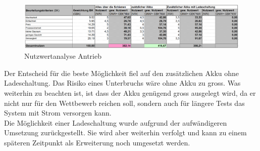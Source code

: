 \documentclass[../../../main.tex]{subfiles}
\begin{document}
    \begin{figure}[H]
        \centering
        \includegraphics[width=1.0\textwidth]{Strom_Nutzwertanalyse.png}
        \caption {Nutzwertanalyse Antrieb}
        \label{fig:strom_nutzwertanalyse}
    \end{figure}

    Der Entscheid für die beste Möglichkeit fiel auf den zusätzlichen Akku ohne Ladeschaltung. Das Risiko eines Unterbruchs wäre ohne Akku zu gross. Was weiterhin zu beachten ist, ist dass der Akku genügend gross ausgelegt wird, da er nicht nur für den Wettbewerb reichen soll, sondern auch für längere Tests das System mit Strom versorgen kann.\\ 
    Die Möglichkeit einer Ladeschaltung wurde aufgrund der aufwändigeren Umsetzung zurückgestellt. Sie wird aber weiterhin verfolgt und kann zu einem späteren Zeitpunkt als Erweiterung noch umgesetzt werden.
    


    
\end{document}

